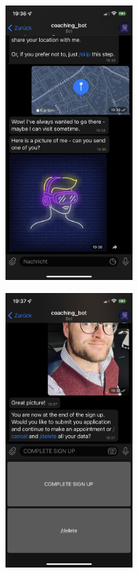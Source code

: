	\begin{figure}
		\centering
		\begin{minipage}{.48\linewidth}
			\centering
			{\includegraphics[width=\linewidth,height=300pt,keepaspectratio]{images/Screenshots/photo.PNG}}
		
			{\includegraphics[width=\linewidth,height=300pt,keepaspectratio]{images/Screenshots/complete-sign-up.PNG}}
		

\end{minipage}
\end{figure}
